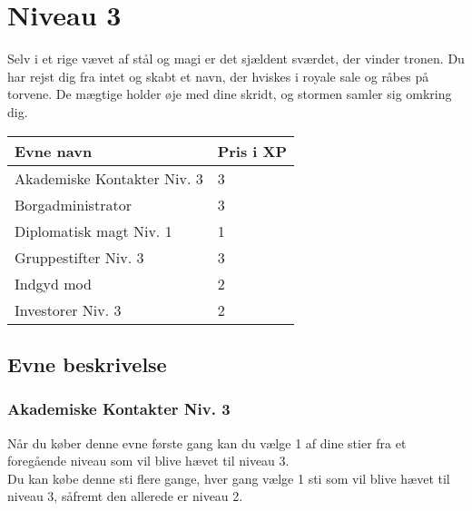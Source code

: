 \chapter*{Niveau 3}
Selv i et rige vævet af stål og magi er det sjældent sværdet, der vinder tronen. Du har rejst dig fra intet og skabt et navn, der hviskes i royale sale og råbes på torvene. De mægtige holder øje med dine skridt, og stormen samler sig omkring dig.
\begin{table}[H]
    \centering
    \begin{tabular}{|p{}|p{}|}
    \rowcolor{cerulean!80}\hline
        Evne navn & Pris i XP \\\hline
        Akademiske Kontakter Niv. 3 & 3\\\hline
        Borgadministrator & 3\\\hline
        Diplomatisk magt Niv. 1 & 1\\\hline
        Gruppestifter Niv. 3 & 3 \\\hline
        Indgyd mod & 2\\\hline
        Investorer Niv. 3 & 2 \\\hline
    \end{tabular}
\end{table}
\section*{Evne beskrivelse}

\subsection*{Akademiske Kontakter Niv. 3}

Når du køber denne evne første gang kan du vælge 1 af dine stier fra et foregående niveau som vil blive hævet til niveau 3.\\
Du kan købe denne sti flere gange, hver gang vælge 1 sti som vil blive hævet til niveau 3, såfremt den allerede er niveau 2. \\

